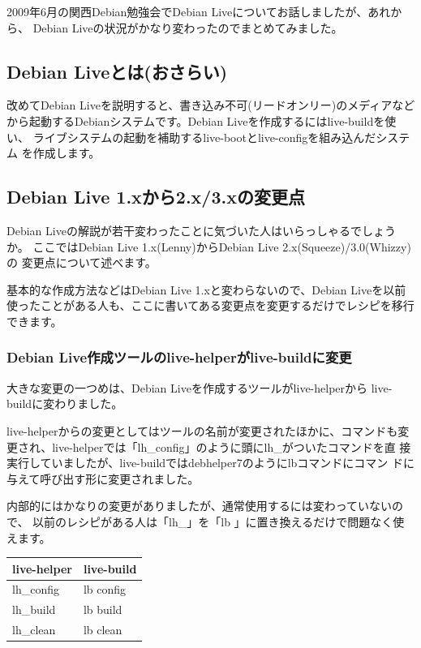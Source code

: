 \documentclass[mingoth,a4paper]{jsarticle}
\begin{document}

2009年6月の関西Debian勉強会でDebian Liveについてお話しましたが、あれから、
Debian Liveの状況がかなり変わったのでまとめてみました。


\subsection{Debian Liveとは(おさらい)}

改めてDebian Liveを説明すると、書き込み不可(リードオンリー)のメディアなど
から起動するDebianシステムです。Debian Liveを作成するにはlive-buildを使い、
ライブシステムの起動を補助するlive-bootとlive-configを組み込んだシステム
を作成します。

\subsection{Debian Live 1.xから2.x/3.xの変更点}

Debian Liveの解説が若干変わったことに気づいた人はいらっしゃるでしょうか。
ここではDebian Live 1.x(Lenny)からDebian Live 2.x(Squeeze)/3.0(Whizzy)の
変更点について述べます。

基本的な作成方法などはDebian Live 1.xと変わらないので、Debian Liveを以前
使ったことがある人も、ここに書いてある変更点を変更するだけでレシピを移行
できます。


\subsubsection{Debian Live作成ツールのlive-helperがlive-buildに変更}

大きな変更の一つめは、Debian Liveを作成するツールがlive-helperから
live-buildに変わりました。

live-helperからの変更としてはツールの名前が変更されたほかに、コマンドも変
更され、live-helperでは「lh\_config」のように頭にlh\_がついたコマンドを直
接実行していましたが、live-buildではdebhelper7のようにlbコマンドにコマン
ドに与えて呼び出す形に変更されました。

内部的にはかなりの変更がありましたが、通常使用するには変わっていないので、
以前のレシピがある人は「lh\_」を「lb 」に置き換えるだけで問題なく使えます。

\begin{table}[h]
\begin{center}
 \begin{tabular}{|l|l|}
 \hline
 live-helper & live-build \\
 \hline \hline
 lh\_config & lb config \\
 \hline
 lh\_build & lb build \\
 \hline
 lh\_clean & lb clean \\
 \hline
 \end{tabular}
\end{center}
\end{table}
\end{document}
